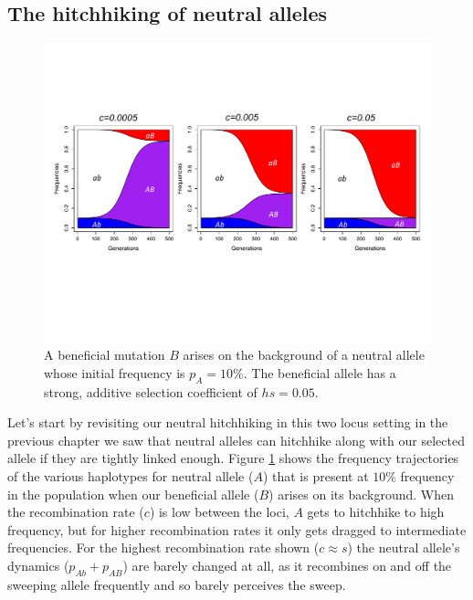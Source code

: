 \subsection{The hitchhiking of neutral alleles}
\begin{figure}
\begin{center}
  \includegraphics[width = 0.9 \textwidth]{figures/selection_recom_interaction/Neutral_Hitchhiking_labeled.pdf}
\end{center}
\caption{A beneficial mutation $B$ arises on the background of a neutral allele whose initial frequency is $p_A=10\%$. The beneficial allele has a strong, additive selection coefficient of $hs=0.05$.} \label{fig:Neutral_HH}  %
\end{figure}
Let's start by revisiting our neutral hitchhiking in this two locus setting in the previous chapter we saw that neutral alleles can hitchhike along with our selected allele if they are tightly linked enough. Figure \ref{fig:Neutral_HH}  shows the frequency trajectories of the various haplotypes for neutral allele ($A$) that is present at $10\%$ frequency in the population when our beneficial allele ($B$) arises on its background. When the recombination rate ($c$) is low between the loci, $A$ gets to hitchhike to high frequency, but for higher recombination rates it only gets dragged to intermediate frequencies. For the highest recombination rate shown ($c \approx s$) the neutral allele's dynamics ($p_{Ab}+p_{AB}$) are barely changed at all, as it recombines on and off the sweeping allele frequently and so barely perceives the sweep. 


